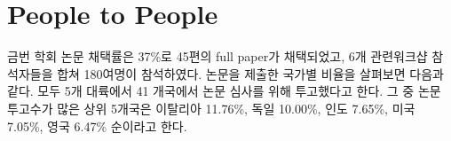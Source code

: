 \documentclass[twocolumn]{article}
\begin{document}
%
%
%

%
%
%
%
%
%
%
%
%



\section{People to People}
금번 학회 논문 채택률은 37\%로 45편의 full paper가  채택되었고, 6개 관련워크샵 참석자들을 합쳐 180여명이 참석하였다. 논문을 제출한 국가별 비율을 살펴보면 다음과 같다. 모두 5개 대륙에서 41 개국에서 논문 심사를 위해 투고했다고 한다. 그 중 논문 투고수가 많은 상위 5개국은 이탈리아 11.76\%, 독일 10.00\%, 인도 7.65\%, 미국 7.05\%, 영국 6.47\% 순이라고 한다.
\end{document}
